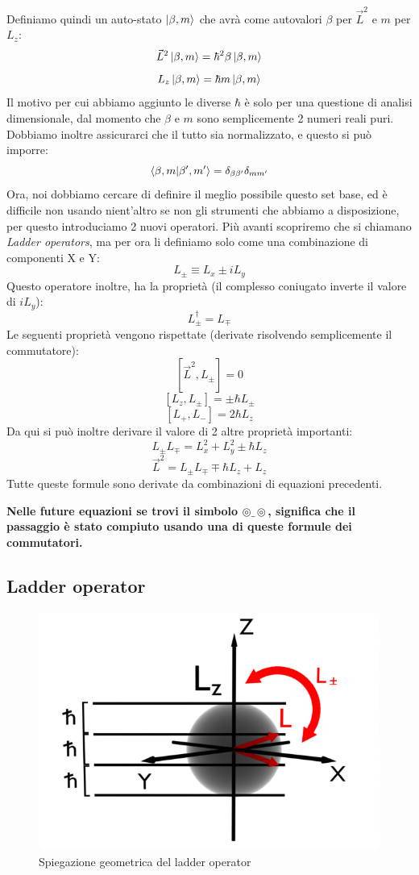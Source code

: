 Definiamo quindi un auto-stato $\ket{\beta, m}$ che avrà come autovalori $\beta$ per $\vec{L}^2$ e $m$ per $L_z$:
$$\vec{L}^2 \ket{\beta, m} = \hbar^2\beta\ket{\beta, m}$$
$$L_z \ket{\beta, m} = \hbar m\ket{\beta, m}$$
Il motivo per cui abbiamo aggiunto le diverse $\hbar$ è solo per una questione di analisi dimensionale, dal momento che $\beta$ e $m$ sono semplicemente 2 numeri reali puri.
Dobbiamo inoltre assicurarci che il tutto sia normalizzato, e questo si può imporre:
$$\braket{\beta, m|\beta', m'} = \delta_{\beta\beta'}\delta_{mm'}$$
Ora, noi dobbiamo cercare di definire il meglio possibile questo set base, ed è difficile non usando nient'altro se non gli strumenti che abbiamo a disposizione, per questo introduciamo 2 nuovi operatori. Più avanti scopriremo che si chiamano \textit{Ladder operators}, ma per ora li definiamo solo come una combinazione di componenti X e Y:
$$L_{\pm} \equiv L_x \pm iL_y$$
Questo operatore inoltre, ha la proprietà (il complesso coniugato inverte il valore di $iL_y$):
$$L_{\pm}^{\dagger} = L_{\mp}$$
Le seguenti proprietà vengono rispettate (derivate risolvendo semplicemente il commutatore):
$$[\vec{L}^2, L_{\pm}] = 0$$
$$[L_z, L_{\pm}] = \pm\hbar L_{\pm}$$
$$[L_+, L_-] = 2\hbar L_z$$
Da qui si può inoltre derivare il valore di 2 altre proprietà importanti:
$$L_{\pm}L_{\mp} = L_x^2+L_y^2\pm\hbar L_z$$
$$\vec{L}^2 = L_{\pm}L_{\mp} \mp \hbar L_z + L_z$$
Tutte queste formule sono derivate da combinazioni di equazioni precedenti. 

\vspace{15pt}

\noindent \textbf{Nelle future equazioni se trovi il simbolo $\circledcirc \_ \circledcirc$, significa che il passaggio è stato compiuto usando una di queste formule dei commutatori.}

\newpage

\subsection{Ladder operator}

\begin{figure}[ht]
	\centering
	\includegraphics[width=.5\textwidth]{../images/ladder.png} 
	\caption{Spiegazione geometrica del ladder operator}
	\label{fig:ladder}
\end{figure}

